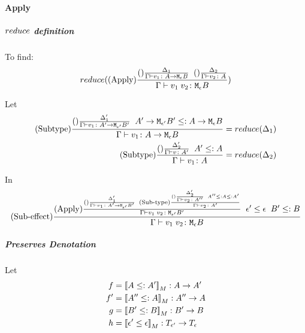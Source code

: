 {            \paragraph{Apply}
            \subparagraph{$reduce$ definition}
            To find:
            \begin{equation}
                reduce((\text{Apply}) \frac{
                    (\text{}) \frac{\Delta_1}{
                        \Gamma \vdash v_1 \colon A \rightarrow \texttt{M}_{\epsilon}{B}
                    }
                    \;\;
                    (\text{}) \frac{\Delta_2}{
                        \Gamma \vdash v_2 \colon A
                    }
                }{
                    \Gamma \vdash v_1\; v_2 \colon \texttt{M}_{\epsilon}{B}
                })
            \end{equation}

            Let
            \begin{align}
                (\text{Subtype}) \frac{
                    (\text{}) \frac{\Delta'_1}{\Gamma \vdash v_1 \colon A' \rightarrow \texttt{M}_{\epsilon'}{B'}}
                    \;\;
                    A' \rightarrow \texttt{M}_{\epsilon'}{B'}\leq:A \rightarrow \texttt{M}_{\epsilon}{B}
                }{
                    \Gamma \vdash v_1 \colon A \rightarrow \texttt{M}_{\epsilon}{B}
                } & = reduce(\Delta_1)\\
                (\text{Subtype}) \frac{
                    (\text{}) \frac{\Delta'_2}{\Gamma \vdash v \colon A'}
                    \;\;
                    A'\leq: A
                }{
                    \Gamma \vdash v_1 \colon A
                } & = reduce(\Delta_2)
            \end{align}

            In
            \begin{equation}
                (\text{Sub-effect}) \frac{
                    (\text{Apply}) \frac{
                        (\text{}) \frac{
                            \Delta'_1
                        }{
                            \Gamma \vdash v_1 \colon A' \rightarrow \texttt{M}_{\epsilon'}{B'}
                        }
                    \;\;
                        (\text{Sub-type}) \frac{
                            (\text{}) \frac{\Delta'_2}{\Gamma \vdash v_2 \colon A''}
                            \;\;
                            A'' \leq: A \leq: A'
                        }{
                            \Gamma \vdash v_2 \colon A'
                        }
                    }{
                        \Gamma \vdash v_1\; v_2 \colon \texttt{M}_{\epsilon'}{B'}
                    }
                    \;\;
                    \epsilon' \leq \epsilon
                    \;\;
                    B' \leq: B
                }{
                    \Gamma \vdash v_1\; v_2 \colon \texttt{M}_{\epsilon}{B}
                }
            \end{equation}
            \subparagraph{Preserves Denotation}
                Let
                \begin{align}
                    f & = \deno{A\subtype A'}: A\rightarrow A' \\
                    f' & = \deno{A''\subtype A}: A'' \rightarrow A \\
                    g & = \deno{B' \subtype B}: B' \rightarrow B \\
                    h & = \deno{\e' \subeffect \e}: \T{\e'}{} \rightarrow \T{\e}{}
                \end{align}

}

